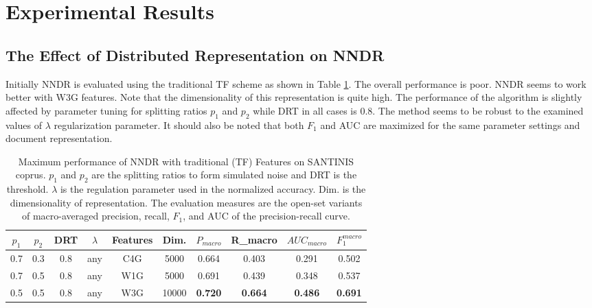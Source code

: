 \section{Experimental Results}\label{chap:word_embeddings:sec:results}

\subsection{The Effect of Distributed Representation on NNDR}\label{chap:word_embeddings:sec:NNDR_PVBOW_vs_BOW}

Initially NNDR is evaluated using the traditional TF scheme as shown in Table \ref{chap:word_embeddings:tbl:NNDR_TF}. The overall performance is poor. NNDR seems to work better with W3G features. Note that the dimensionality of this representation is quite high. The performance of the algorithm is slightly affected by parameter tuning for splitting ratios $p_{1}$ and $p_{2}$ while DRT in all cases is $0.8$. The method seems to be robust to the examined values of $\lambda$ regularization parameter. It should also be noted that both $F_1$ and AUC are maximized for the same parameter settings and document representation.

\begin{table}[t]
\center
\begin{tabular}{cccccccccc}
\hline
$p_{1}$ & $p_{2}$ & DRT & $\lambda$ & Features & Dim. & $P_{macro}$ & R_{macro} & $AUC_{macro}$ & $F_1^{macro}$ \\
\hline
0.7 & 0.3 & 0.8 & any & C4G & 5000 & 0.664 & 0.403 & 0.291 & 0.502 \\
0.7 & 0.5 & 0.8 & any & W1G & 5000 & 0.691 & 0.439 & 0.348 & 0.537 \\
0.5 & 0.5 & 0.8 & any & W3G & 10000 & \textbf{0.720} & \textbf{0.664} & \textbf{0.486} & \textbf{0.691} \\
\hline
\end{tabular}
\caption{Maximum performance of NNDR with traditional (TF) Features on SANTINIS coprus. $p_{1}$ and $p_{2}$ are the splitting ratios to form simulated noise and DRT is the threshold. $\lambda$ is the regulation parameter used in the normalized accuracy. Dim. is the dimensionality of representation. The evaluation measures are the open-set variants of macro-averaged precision, recall, $F_1$, and AUC of the precision-recall curve.}
\label{chap:word_embeddings:tbl:NNDR_TF}
\end{table}

